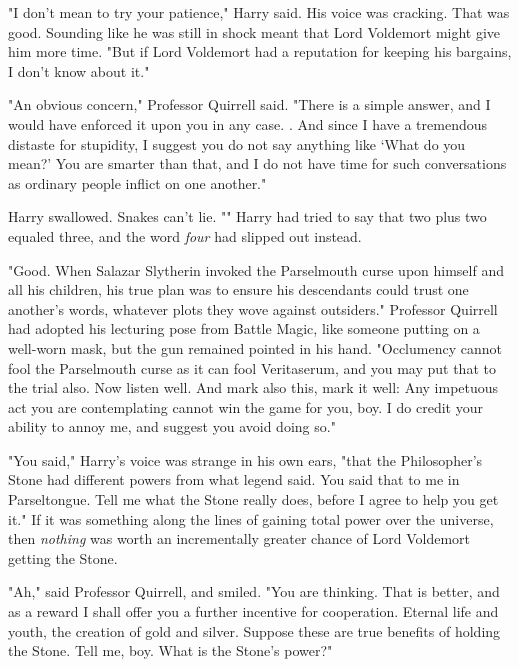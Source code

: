"I don't mean to try your patience," Harry said. His voice was cracking. That
was good. Sounding like he was still in shock meant that Lord Voldemort might
give him more time. "But if Lord Voldemort had a reputation for keeping his
bargains, I don't know about it."

"An obvious concern," Professor Quirrell said. "There is a simple answer, and I
would have enforced it upon you in any case. . And
since I have a tremendous distaste for stupidity, I suggest you do not say
anything like `What do you mean?' You are smarter than that, and I do not have
time for such conversations as ordinary people inflict on one another."

Harry swallowed. Snakes can't lie. "" Harry
had tried to say that two plus two equaled three, and the word \emph{four} had
slipped out instead.

"Good. When Salazar Slytherin invoked the Parselmouth curse upon himself and
all his children, his true plan was to ensure his descendants could trust one
another's words, whatever plots they wove against outsiders." Professor
Quirrell had adopted his lecturing pose from Battle Magic, like someone putting
on a well-worn mask, but the gun remained pointed in his hand. "Occlumency
cannot fool the Parselmouth curse as it can fool Veritaserum, and you may put
that to the trial also. Now listen well.  And mark also this, mark it well:  Any impetuous act you are
contemplating cannot win the game for you, boy. I do credit your ability to
annoy me, and suggest you avoid doing so."

"You said," Harry's voice was strange in his own ears, "that the Philosopher's
Stone had different powers from what legend said. You said that to me in
Parseltongue. Tell me what the Stone really does, before I agree to help you
get it." If it was something along the lines of gaining total power over the
universe, then \emph{nothing} was worth an incrementally greater chance of Lord
Voldemort getting the Stone.

"Ah," said Professor Quirrell, and smiled. "You are thinking. That is better,
and as a reward I shall offer you a further incentive for cooperation. Eternal
life and youth, the creation of gold and silver. Suppose these are true
benefits of holding the Stone. Tell me, boy. What is the Stone's power?"

